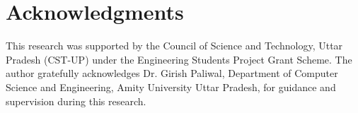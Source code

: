 \documentclass[10pt, conference]{IEEEtran}
\begin{document}
\section*{Acknowledgments}
This research was supported by the Council of Science and Technology, Uttar Pradesh (CST-UP) under the Engineering Students Project Grant Scheme. The author gratefully acknowledges Dr. Girish Paliwal, Department of Computer Science and Engineering, Amity University Uttar Pradesh, for guidance and supervision during this research.

\balance


\end{document}

